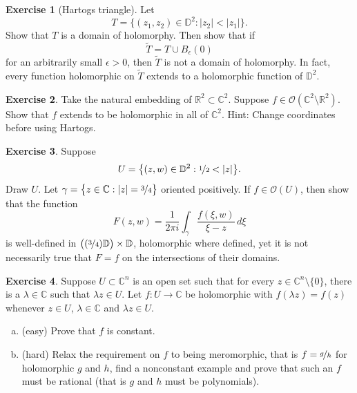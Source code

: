 \documentclass[12pt,openany]{book}
\newcommand{\sabs}[1]{\lvert {#1} \rvert}
\newcommand{\C}{{\mathbb{C}}}
\newcommand{\R}{{\mathbb{R}}}
\newcommand{\D}{{\mathbb{D}}}
\newcommand{\sO}{{\mathscr{O}}}
\newcommand{\myindex}[1]{#1\index{#1}}
\theoremstyle{plain}
\theoremstyle{remark}
\theoremstyle{definition}
\newenvironment{exbox}{%
    \def\FrameCommand{\vrule width 1pt \relax\hspace {10pt}}%
    \MakeFramed {\advance \hsize -\width \FrameRestore }%
}{%
    \endMakeFramed
}
\newenvironment{exparts}{%
    \leavevmode\begin{enumerate}[a),noitemsep,topsep=0pt,parsep=0pt,partopsep=0pt]
}{%
    \end{enumerate}
}
\theoremstyle{exercise}
\newtheorem{exercise}{Exercise}[section]
\theoremstyle{example}
\begin{document}
\begin{exbox}
\begin{exercise}[\myindex{Hartogs triangle}]\label{exercise:hartogstriangle}
Let
\begin{equation*}
T = \bigl\{ (z_1,z_2) \in \D^2 : \sabs{z_2} < \sabs{z_1} \bigr\} .
\end{equation*}
Show that $T$ is a domain of holomorphy.  Then show that if
\begin{equation*}
\widetilde{T} = T \cup B_{\epsilon}(0)
\end{equation*}
for an arbitrarily small $\epsilon > 0$, then $\widetilde{T}$ is not a domain
of holomorphy.  In fact, every function holomorphic on $\widetilde{T}$
extends to a holomorphic function of $\D^2$.
\end{exercise}

\begin{exercise} \label{exercise:C2minusR2}
Take the natural embedding of $\R^2 \subset \C^2$.  Suppose 
$f \in \sO(\C^2 \setminus \R^2)$.  Show that $f$ extends to be holomorphic
in all of $\C^2$.  Hint: Change coordinates before using Hartogs.
\end{exercise}

\begin{exercise} \label{exercise:fatcylinder1}
Suppose 
\begin{equation*}
U = \bigl\{ (z,w) \in \D^2 : \nicefrac{1}{2} < \sabs{z} \bigr\} .
\end{equation*}
Draw $U$.  
Let $\gamma = \bigl\{ z \in \C : \sabs{z} = \nicefrac{3}{4} \bigr\}$ oriented positively.
If $f \in \sO(U)$, then show that the function
\begin{equation*}
F(z,w)
=
\frac{1}{2\pi i}
\int_\gamma \frac{f(\xi,w)}{\xi-z} \, d\xi
\end{equation*}
is well-defined in
$\bigl( (\nicefrac{3}{4}) \D \bigr) \times \D$, holomorphic where defined, yet
it is not necessarily true that $F = f$ on the intersections of their
domains.
\end{exercise}

\begin{exercise}
Suppose $U \subset \C^n$ is an open set such that for every
$z \in \C^n \setminus \{ 0 \}$, there is a $\lambda \in \C$ such that
$\lambda z \in U$.  Let $f \colon U \to \C$ be holomorphic with
$f(\lambda z) = f(z)$ whenever $z \in U$, $\lambda \in \C$ and $\lambda z
\in U$.
\begin{exparts}
\item
(easy) Prove that $f$ is constant.
\item
(hard) Relax the requirement on
$f$ to being meromorphic, that is $f = \nicefrac{g}{h}$
for holomorphic $g$ and $h$,
find a nonconstant example and prove that such an $f$ must be rational (that
is $g$ and $h$ must be polynomials).
\end{exparts}
\end{exercise}


\end{exbox}
\end{document}
